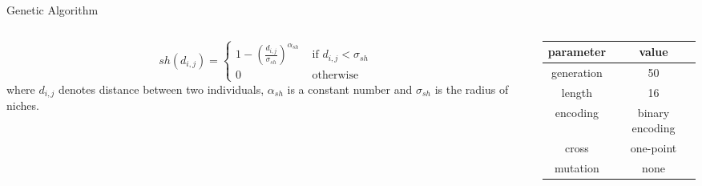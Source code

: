 \documentclass{beamer}
\begin{document}
\begin{frame}{Genetic Algorithm}
\begin{columns}[c]
    \begin{column}{0.6\textwidth}
   
        \begin{equation}
        s h\left(d_{i, j}\right)=\left\{\begin{array}{ll}{1-\left(\frac{d_{i, j}}{\sigma_{s h}}\right)^{\alpha_{s h}}} 
            & {\text { if } d_{i, j}<\sigma_{s h}} \\ 
        {0} & {\text { otherwise }}\end{array}\right.
        \end{equation}
        where $d_{i,j}$ denotes distance between two individuals, $\alpha_{s h}$
        is a constant number and $\sigma_{s h}$ is the radius of niches.
    \end{column}
    \begin{column}{0.4\textwidth}
        \begin{center}
        \begin{tabular}{cc}
            \toprule
            parameter & value \\
            \midrule
            generation           & 50 \\
            length      & 16 \\
            encoding& binary encoding\\
            cross& one-point \\
            mutation& none \\
            \bottomrule
        \end{tabular}
        \label{tab:GA}
        \end{center}
    \end{column}
\end{columns}



\end{frame}
\end{document}
